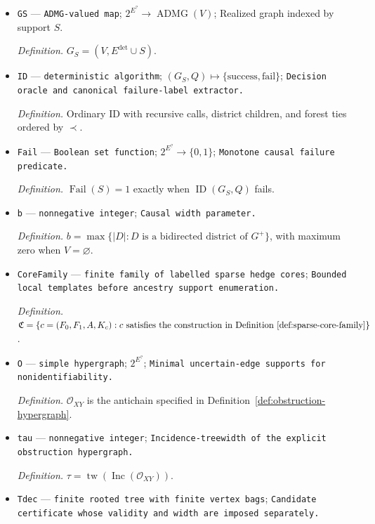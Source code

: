 \documentclass{article}
\begin{document}
\begin{itemize}
  \par\smallskip\noindent\emph{Definition.} \(Z=\{e\in E^{?}:Z_e=1\}\).
  \item \texttt{GS} --- \texttt{ADMG-\allowbreak{}valued map}; \(2^{E^{?}}\to\operatorname{ADMG}(V)\); Realized graph indexed by support \(S\).
  \par\smallskip\noindent\emph{Definition.} \(G_S=(V,E^{\mathrm{det}}\cup S)\).
  \item \texttt{ID} --- \texttt{deterministic algorithm}; \((G_S,Q)\mapsto\{\mathrm{success},\mathrm{fail}\}\); \texttt{Decision oracle and canonical failure-\allowbreak{}label extractor.}
  \par\smallskip\noindent\emph{Definition.} Ordinary ID with recursive calls, district children, and forest ties ordered by \(\prec\).
  \item \texttt{Fail} --- \texttt{Boolean set function}; \(2^{E^{?}}\to\{0,1\}\); \texttt{Monotone causal failure predicate.}
  \par\smallskip\noindent\emph{Definition.} \(\operatorname{Fail}(S)=1\) exactly when \(\operatorname{ID}(G_S,Q)\) fails.
  \item \texttt{b} --- \texttt{nonnegative integer}; \texttt{Causal width parameter.}
  \par\smallskip\noindent\emph{Definition.} \(b=\max\{|D|:D\text{ is a bidirected district of }G^{+}\}\), with maximum zero when \(V=\varnothing\).
  \item \texttt{CoreFamily} --- \texttt{finite family of labelled sparse hedge cores}; \texttt{Bounded local templates before ancestry support enumeration.}
  \par\smallskip\noindent\emph{Definition.} \(\mathfrak C=\{c=(F_0,F_1,A,K_c):c\text{ satisfies the construction in Definition~\ref{def:sparse-core-family}}\}\).
  \item \texttt{O} --- \texttt{simple hypergraph}; \(2^{E^{?}}\); \texttt{Minimal uncertain-\allowbreak{}edge supports for nonidentifiability.}
  \par\smallskip\noindent\emph{Definition.} \(\mathcal O_{XY}\) is the antichain specified in Definition~\ref{def:obstruction-hypergraph}.
  \item \texttt{tau} --- \texttt{nonnegative integer}; \texttt{Incidence-\allowbreak{}treewidth of the explicit obstruction hypergraph.}
  \par\smallskip\noindent\emph{Definition.} \(\tau=\operatorname{tw}(\operatorname{Inc}(\mathcal O_{XY}))\).
  \item \texttt{Tdec} --- \texttt{finite rooted tree with finite vertex bags}; \texttt{Candidate certificate whose validity and width are imposed separately.}

\end{itemize}
\end{document}
